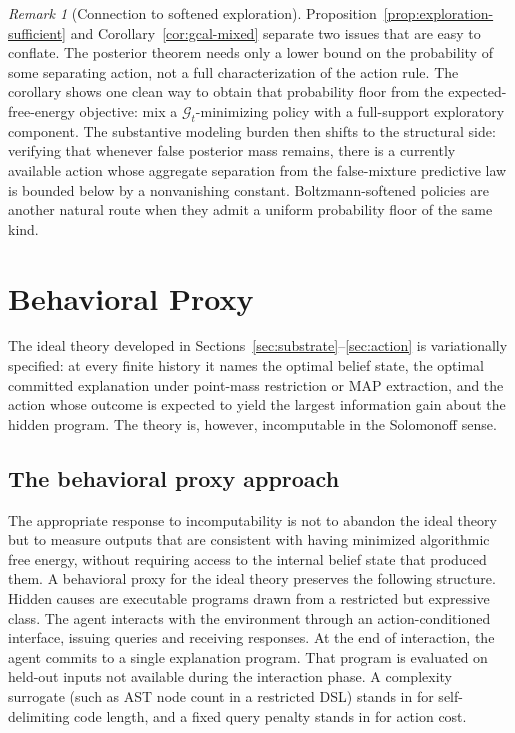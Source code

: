 \documentclass[11pt]{article}
\theoremstyle{remark}
\newtheorem{remark}[definition]{Remark}
\newcommand{\Gcal}{\mathcal{G}}
\begin{document}
\begin{remark}[Connection to softened exploration]
Proposition~\ref{prop:exploration-sufficient} and Corollary~\ref{cor:gcal-mixed} separate two issues that are easy to conflate. The posterior theorem needs only a lower bound on the probability of some separating action, not a full characterization of the action rule. The corollary shows one clean way to obtain that probability floor from the expected-free-energy objective: mix a \(\Gcal_t\)-minimizing policy with a full-support exploratory component. The substantive modeling burden then shifts to the structural side: verifying that whenever false posterior mass remains, there is a currently available action whose aggregate separation from the false-mixture predictive law is bounded below by a nonvanishing constant. Boltzmann-softened policies are another natural route when they admit a uniform probability floor of the same kind.
\end{remark}

\section{Behavioral Proxy}
\label{sec:proxy}

The ideal theory developed in Sections~\ref{sec:substrate}--\ref{sec:action} is variationally specified: at every finite history it names the optimal belief state, the optimal committed explanation under point-mass restriction or MAP extraction, and the action whose outcome is expected to yield the largest information gain about the hidden program. The theory is, however, incomputable in the Solomonoff sense.

\subsection{The behavioral proxy approach}

The appropriate response to incomputability is not to abandon the ideal theory but to measure outputs that are consistent with having minimized algorithmic free energy, without requiring access to the internal belief state that produced them. A behavioral proxy for the ideal theory preserves the following structure. Hidden causes are executable programs drawn from a restricted but expressive class. The agent interacts with the environment through an action-conditioned interface, issuing queries and receiving responses. At the end of interaction, the agent commits to a single explanation program. That program is evaluated on held-out inputs not available during the interaction phase. A complexity surrogate (such as AST node count in a restricted DSL) stands in for self-delimiting code length, and a fixed query penalty stands in for action cost.
\end{document}
